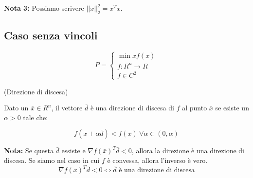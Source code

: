 \textbf{Nota 3:} Possiamo scrivere $||x||_2^2 = x^Tx$.


\subsection*{Caso senza vincoli}

$$
P = \begin{cases}
    \min{x}  f(x)\\
    f:R^n  \rightarrow R\\
    f  \in C^2
\end{cases}
$$

\begin{definition}
    (Direzione di discesa)

    Dato un $\bar{x} \in R^n$, il vettore $\bar{d}$ è una direzione di discesa di $f$ al
    punto $\bar{x}$ se esiste un $\bar{\alpha} > 0$ tale che:

    $$f(\bar{x} + \alpha \bar{d}) < f(\bar{x}) \ \forall \alpha \in (0, \bar{\alpha})$$

    \textbf{Nota:} Se questa $\bar{d}$ essiste e $\nabla f(\bar{x})^T \bar{d} < 0$, allora la direzione è una direzione di discesa. Se 
    siamo nel caso in cui $f$ è convessa, allora l'inverso è vero.
    $$\nabla f(\bar{x})^T \bar{d} < 0 \iff \bar{d} \text{ è una direzione di discesa}$$
\end{definition}

